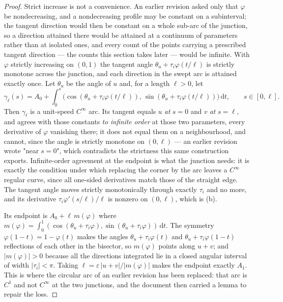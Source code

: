 \begin{proof}
Strict increase is not a convenience. An earlier revision asked only that
$\varphi$ be nondecreasing, and a nondecreasing profile may be constant on a
subinterval; the tangent direction would then be constant on a whole sub-arc of
the junction, so a direction attained there would be attained at a continuum of
parameters rather than at isolated ones, and every count of the points carrying
a prescribed tangent direction --- the counts this section takes later --- would
be infinite. With $\varphi$ strictly increasing on $(0,1)$ the tangent angle
$\theta_u+\tau_i\varphi(t/\ell)$ is strictly monotone across the junction, and
each direction in the swept arc is attained exactly once. Let
$\theta_u$ be the angle of $u$ and, for a length $\ell>0$, let
\[
   \gamma_\ell(s)=A_0+\int_0^{s}
   \bigl(\cos(\theta_u+\tau_i\varphi(t/\ell)),\,
         \sin(\theta_u+\tau_i\varphi(t/\ell))\bigr)\,\mathrm dt,
   \qquad s\in[0,\ell].
\]
Then $\gamma_\ell$ is a unit-speed $C^\infty$ arc. Its tangent equals $u$
\emph{at} $s=0$ and $v$ \emph{at} $s=\ell$, and agrees with those constants
\emph{to infinite order} at those two parameters, every derivative of $\varphi$
vanishing there; it does not equal them on a neighbourhood, and cannot, since
the angle is strictly monotone on $(0,\ell)$ --- an earlier revision wrote
"near $s=0$", which contradicts the strictness this same construction exports.
Infinite-order agreement at the endpoint is what the junction needs: it is
exactly the condition under which replacing the corner by the arc leaves a
$C^\infty$ regular curve, since all one-sided derivatives match those of the
straight edge. The tangent angle moves strictly monotonically through exactly
$\tau_i$ and no more, and its derivative
$\tau_i\varphi'(s/\ell)/\ell$ is nonzero on $(0,\ell)$, which is (b).

Its endpoint is $A_0+\ell\,m(\varphi)$ where
$m(\varphi)=\int_0^1(\cos(\theta_u+\tau_i\varphi),\sin(\theta_u+\tau_i\varphi))\,
\mathrm dt$. The symmetry $\varphi(1-t)=1-\varphi(t)$ makes the angles
$\theta_u+\tau_i\varphi(t)$ and $\theta_u+\tau_i\varphi(1-t)$ reflections of
each other in the bisector, so $m(\varphi)$ points along $u+v$; and
$|m(\varphi)|>0$ because all the directions integrated lie in a closed angular
interval of width $|\tau_i|<\pi$. Taking
$\ell=\varepsilon\,|u+v|/|m(\varphi)|$ makes the endpoint exactly $A_1$. This is
where the circular arc of an earlier revision has been replaced: that arc is
$C^1$ and not $C^\infty$ at the two junctions, and the document then carried a
lemma to repair the loss.


\end{proof}
